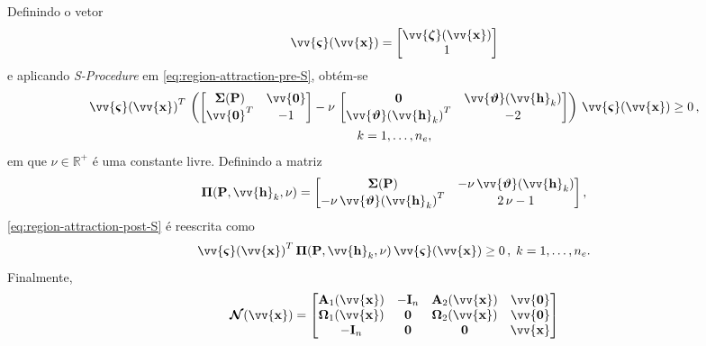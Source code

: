 \documentclass{ppgeesa}
\newcommand*{\Prod}{\,}
\newcommand*{\Bold}[1]{\boldsymbol{\mathbf{#1}}}
\newcommand*{\Matr}[1]{\Bold{#1}}
\newcommand*{\Vect}[1]{\vv{\Bold{#1}}}
\newcommand*{\Transp}[1]{{#1}^{T}}
\begin{document}
Definindo o vetor
\begin{equation}
  \Vect{\varsigma}(\Vect{x}) = \begin{bmatrix} \Vect{\zeta}(\Vect{x}) \\ 1 \end{bmatrix}
\end{equation}
e aplicando \textit{S-Procedure} \cite{book:Boyd2004} em \eqref{eq:region-attraction-pre-S}, obtém-se
\begin{equation}\label{eq:region-attraction-post-S}
  \begin{gathered}
    \Transp{\Vect{\varsigma}(\Vect{x})} \Prod \left(\begin{bmatrix}
      \Matr{\Sigma}(\Matr{P}) & \Vect{0} \\
      \Transp{\Vect{0}}       & -1       \\
    \end{bmatrix} - \nu \Prod \begin{bmatrix}
      \Matr{0}                              & \Vect{\vartheta}(\Vect{h}_k) \\
      \Transp{\Vect{\vartheta}(\Vect{h}_k)} & -2                           \\
    \end{bmatrix}\right) \Prod \Vect{\varsigma}(\Vect{x}) \geq 0
    \,,\\ k = 1, \dotsc, n_e
    ,
  \end{gathered}
\end{equation}
\vspace{-5pt}
em que $\nu \in \mathbb{R}^+$ é uma constante livre.
Definindo a matriz
\begin{equation}
  \Matr{\Pi}(\Matr{P}, \Vect{h}_k, \nu) = \begin{bmatrix}
    \Matr{\Sigma}(\Matr{P})                          & -\nu \Prod \Vect{\vartheta}(\Vect{h}_k) \\
    -\nu \Prod \Transp{\Vect{\vartheta}(\Vect{h}_k)} & 2 \Prod \nu - 1                         \\
  \end{bmatrix}
  ,
\end{equation}
\eqref{eq:region-attraction-post-S} é reescrita como
\begin{equation}\label{eq:sigma-Pi}
  \Transp{\Vect{\varsigma}(\Vect{x})} \Prod \Matr{\Pi}(\Matr{P}, \Vect{h}_k, \nu) \Prod \Vect{\varsigma}(\Vect{x}) \geq 0
  \,,\; k = 1, \dotsc, n_e
  .
\end{equation}
Finalmente,
\begin{equation}
  \Matr{\mathcal{N}}(\Vect{x}) = \begin{bmatrix}
    \Matr{A}_1(\Vect{x})      & -\Matr{I}_n & \Matr{A}_2(\Vect{x})      & \Vect{0} \\
    \Matr{\Omega}_1(\Vect{x}) & \Matr{0}    & \Matr{\Omega}_2(\Vect{x}) & \Vect{0} \\
    -\Matr{I}_n               & \Matr{0}    & \Matr{0}                  & \Vect{x} \\
  \end{bmatrix}
\end{equation}
\end{document}
